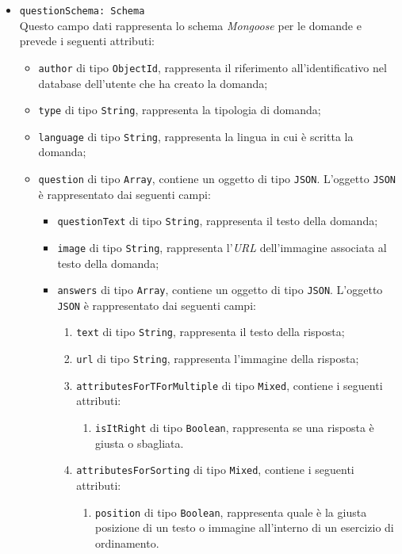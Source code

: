 \begin{itemize}
\begin{itemize}
		\item \texttt{questionSchema: Schema} \\
		Questo campo dati rappresenta lo schema \textit{Mongoose} per le domande e prevede i seguenti attributi:
		\begin{itemize}
			\item \texttt{author} di tipo \texttt{ObjectId}, rappresenta il riferimento all'identificativo nel database dell'utente che ha creato la domanda;
			\item \texttt{type} di tipo \texttt{String}, rappresenta la tipologia di domanda;
			\item \texttt{language} di tipo \texttt{String}, rappresenta la lingua in cui è scritta la domanda; 
			\item \texttt{question} di tipo \texttt{Array}, contiene un oggetto di tipo \texttt{JSON}. L'oggetto \texttt{JSON} è rappresentato dai seguenti campi:
				\begin{itemize}
					\item \texttt{questionText} di tipo \texttt{String}, rappresenta il testo della domanda; 
					\item \texttt{image} di tipo \texttt{String}, rappresenta l'\textit{URL} dell'immagine associata al testo della domanda; 
					\item \texttt{answers} di tipo \texttt{Array}, contiene un oggetto di tipo \texttt{JSON}. L'oggetto \texttt{JSON} è rappresentato dai seguenti campi:
					\begin{enumerate}					  
						\item \texttt{text} di tipo \texttt{String}, rappresenta il testo della risposta;
        					\item \texttt{url} di tipo \texttt{String}, rappresenta l'immagine della risposta;
        					\item \texttt{attributesForTForMultiple} di tipo \texttt{Mixed}, contiene i seguenti attributi:
        					\begin{enumerate}
        						\item \texttt{isItRight} di tipo \texttt{Boolean}, rappresenta se una risposta è giusta o sbagliata.
						\end{enumerate}      
						\item \texttt{attributesForSorting} di tipo \texttt{Mixed}, contiene i seguenti attributi:
        					\begin{enumerate}
        						\item \texttt{position} di tipo \texttt{Boolean}, rappresenta quale è la giusta posizione di un testo o immagine all'interno di un esercizio di ordinamento.

\end{enumerate}
\end{enumerate}
\end{itemize}
\end{itemize}
\end{itemize}
\end{itemize}
